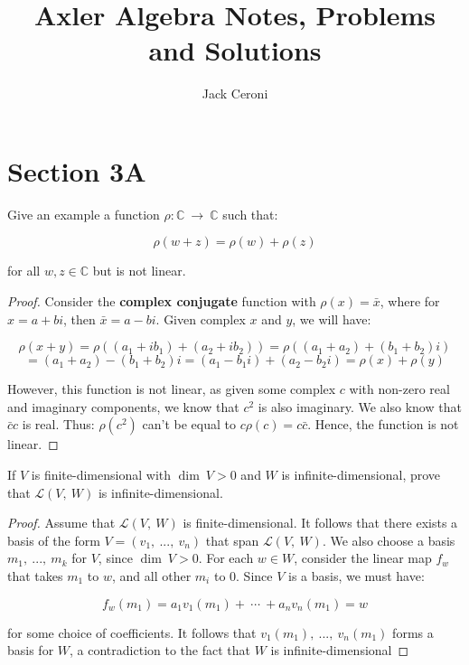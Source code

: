 \documentclass[10pt, oneside]{article}
\title{Axler Algebra Notes, Problems and Solutions}
\author{Jack Ceroni}
\date{}
\newenvironment{problem}[2][Problem]{\begin{trivlist}
\item[\hskip \labelsep {\bfseries #1}\hskip \labelsep {\bfseries #2.}]}{\end{trivlist}}
\begin{document}
    \maketitle
    \tableofcontents

    \vspace{.25in}

    \newpage

    \section{Section 3A}

    \begin{problem}{3.9}
    Give an example a function $\rho : \mathbb{C} \ \rightarrow \ \mathbb{C}$ such that:

    $$\rho(w + z) = \rho(w) + \rho(z)$$

    for all $w, z \in \mathbb{C}$ but is not linear.
    \end{problem}

    \begin{proof}
      Consider the \textbf{complex conjugate} function with $\rho(x) = \bar{x}$, where for $x = a + bi$, then $\bar{x} = a - bi$. Given complex $x$ and $y$, we will have:

      $$\rho(x + y) = \rho((a_1 + ib_1) + (a_2 + ib_2)) = \rho((a_1 + a_2) + (b_1 + b_2)i)$$
      $$ = (a_1 + a_2) - (b_1 + b_2)i = (a_1 - b_1i) + (a_2 - b_2i) = \rho(x) + \rho(y)$$

      However, this function is not linear, as given some complex $c$ with non-zero real and imaginary components, we know that $c^2$ is also imaginary. We also know that $\bar{c} c$ is real. Thus:
      $\rho(c^2)$ can't be equal to $c \rho(c) = c \bar{c}$. Hence, the function is not linear.
    \end{proof}

    \begin{problem}{3.12}
      If $V$ is finite-dimensional with $\dim \ V > 0$ and $W$ is infinite-dimensional, prove that $\mathcal{L}(V, \ W)$ is infinite-dimensional.
    \end{problem}

    \begin{proof}
      Assume that $\mathcal{L}(V, \ W)$ is finite-dimensional. It follows that there exists a basis of the form $V = (v_1, \ ..., \ v_n)$ that span $\mathcal{L}(V, \ W)$. We also choose a basis
      $m_1, \ ..., \ m_k$ for $V$, since $\dim \ V > 0$.
      For each $w \in W$, consider the linear map $f_w$ that takes $m_1$ to $w$, and all other $m_i$ to $0$. Since $V$ is a basis, we must have:

      $$f_w(m_1) = a_1 v_1(m_1) + \ \cdots \ + a_n v_n(m_1) = w$$

      for some choice of coefficients. It follows that $v_1(m_1), \ ..., \ v_n(m_1)$ forms a basis for $W$, a contradiction to the fact that $W$ is infinite-dimensional
    \end{proof}
\end{document}
